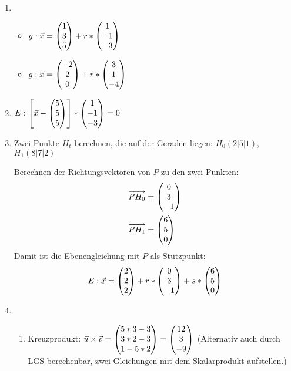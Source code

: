 \begin{lsg}{}
	\begin{enumerate}
		\item
		\begin{itemize}
			\item $g:\vec x=\begin{pmatrix} 1\\3\\5 \end{pmatrix}+r*\begin{pmatrix} 1\\-1\\-3 \end{pmatrix}$
			\item $g:\vec x=\begin{pmatrix} -2\\2\\0 \end{pmatrix}+r*\begin{pmatrix} 3\\1\\-4 \end{pmatrix}$
		\end{itemize}
		\item $E: \left[\vec x-\begin{pmatrix} 5\\5\\5 \end{pmatrix}\right]*\begin{pmatrix} 1\\-1\\-3 \end{pmatrix}=0$
		\item Zwei Punkte $H_t$ berechnen, die auf der Geraden liegen: $H_0(2|5|1)$, $H_1(8|7|2)$

		Berechnen der Richtungsvektoren von $P$ zu den zwei Punkten:
		\begin{align*}
			\overrightarrow{PH_0}&=\begin{pmatrix} 0\\3\\-1 \end{pmatrix}\\
			\overrightarrow{PH_1}&=\begin{pmatrix} 6\\5\\0 \end{pmatrix}
		\end{align*}
		Damit ist die Ebenengleichung mit $P$ als Stützpunkt:
		\begin{equation*}
			E:\vec x=\begin{pmatrix} 2\\2\\2 \end{pmatrix}+r*\begin{pmatrix} 0\\3\\-1 \end{pmatrix}+s*\begin{pmatrix} 6\\5\\0 \end{pmatrix}
		\end{equation*}
		\item
		\begin{enumerate}
			\item Kreuzprodukt: $\vec u\times \vec v=\begin{pmatrix} 5*3-3\\3*2-3\\1-5*2 \end{pmatrix}=\begin{pmatrix} 12\\3\\-9 \end{pmatrix}$
			(Alternativ auch durch LGS berechenbar, zwei Gleichungen mit dem Skalarprodukt aufstellen.)


\end{enumerate}
\end{enumerate}
\end{lsg}
